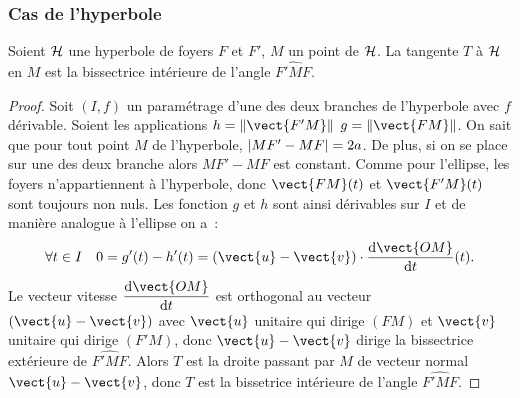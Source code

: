 \subsubsection{Cas de l'hyperbole}
\begin{prop}
  Soient $\mathcal{H}$ une hyperbole de foyers $F$ et $F'$, $M$ un point de $\mathcal{H}$. La tangente $T$ à $\mathcal{H}$ en $M$ est la bissectrice intérieure de l'angle $\widehat{F'MF}$.
\end{prop}
\begin{proof}
  Soit $(I,f)$ un paramétrage d'une des deux branches de l'hyperbole avec $f$ dérivable. Soient les applications $h=\norme{\vect{F'M}}$ $g=\norme{\vect{FM}}$. On sait que pour tout point $M$ de l'hyperbole, $\left\lvert MF'-MF\right\rvert=2a$. De plus, si on se place sur une des deux branche alors $MF'-MF$ est constant. Comme pour l'ellipse, les foyers n'appartiennent à l'hyperbole, donc $\vect{FM}(t)$ et $\vect{F'M}(t)$ sont toujours non nuls. Les fonction $g$ et $h$ sont ainsi dérivables sur $I$ et de manière analogue à l'ellipse on a~:
\begin{equation}
\forall t \in I \quad 0=g'(t)-h'(t)=(\vect{u}-\vect{v})\cdot \derived{\vect{OM}}{t}(t).
\end{equation}
 Le vecteur vitesse $\derived{\vect{OM}}{t}$ est orthogonal au vecteur $(\vect{u}-\vect{v})$ avec $\vect{u}$ unitaire qui dirige $(FM)$ et $\vect{v}$ unitaire qui dirige $(F'M)$, donc $\vect{u}-\vect{v}$ dirige la bissectrice extérieure de $\widehat{F'MF}$. Alors $T$ est la droite passant par $M$ de vecteur normal $\vect{u}-\vect{v}$, donc $T$ est la bissetrice intérieure de l'angle $\widehat{F'MF}$.
\end{proof}